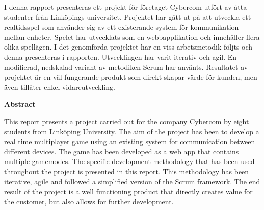 {\justify
I denna rapport presenteras ett projekt för företaget Cybercom utfört av åtta studenter från Linköpings universitet. Projektet har gått ut på att utveckla ett realtidsspel som använder sig av ett existerande system för kommunikation mellan enheter. Spelet har utvecklats som en webbapplikation och innehåller flera olika spellägen. I det genomförda projektet har en viss arbetsmetodik följts och denna presenteras i rapporten. Utvecklingen har varit iterativ och agil. En modifierad, nedskalad variant av metodiken Scrum har använts. Resultatet av projektet är en väl fungerande produkt som direkt skapar värde för kunden, men även tillåter enkel vidareutveckling.\\[1in]\par
}
{\centering
  \indent\textbf{Abstract}\par
}
This report presents a project carried out for the company Cybercom by eight students from Linköping University. The aim of the project has been to develop a real time multiplayer game using an existing system for communication between different devices. The game has been developed as a web app that contains multiple gamemodes. The specific development methodology that has been used throughout the project is presented in this report. This methodology has been iterative, agile and followed a simplified version of the Scrum framework. The end result of the project is a well functioning product that directly creates value for the customer, but also allows for further development.

